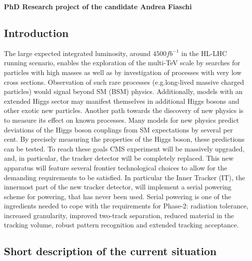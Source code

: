 \documentclass[a4paper,12pt,italian]{article}
\begin{document}
%
\pagestyle{plain}
\noindent


\begin{center}
\noindent  \large{\textbf{PhD Research project of the candidate Andrea Fiaschi}}
\end{center} 


\subsection*{Introduction}

The large expected integrated luminosity, around $4500 fb^{-1}$ in the HL-LHC running scenario, enables the
exploration of the multi-TeV scale by searches for particles with high masses as well as by investigation of processes with very low cross sections. Observation of such rare processes (e.g.long-lived massive charged particles) would signal beyond SM (BSM) physics. Additionally,
models with an extended Higgs sector may manifest themselves in additional Higgs bosons and other exotic new particles. Another path towards the discovery of new physics is to measure its effect on known processes. Many models for new physics predict deviations of the
Higgs boson couplings from SM expectations by several per cent. By precisely measuring the properties of the Higgs boson, these predictions can be tested.
To reach these goals CMS experiment will be massively upgraded, and, in particular, the tracker detector will be completely replaced. 
This new apparatus will feature several frontier technological choices to allow for the demanding requirements to be satisfied. 
In particular the Inner Tracker (IT), the innermost part of the new tracker detector, will implement a serial powering scheme for powering, that has never been used. 
Serial powering is one of the ingredients  needed to cope with the requirements for Phase-2: radiation tolerance, increased granularity, improved two-track separation, reduced material in the tracking volume, robust pattern recognition and extended tracking acceptance.


\subsection*{Short description of the current situation}
\end{document}
